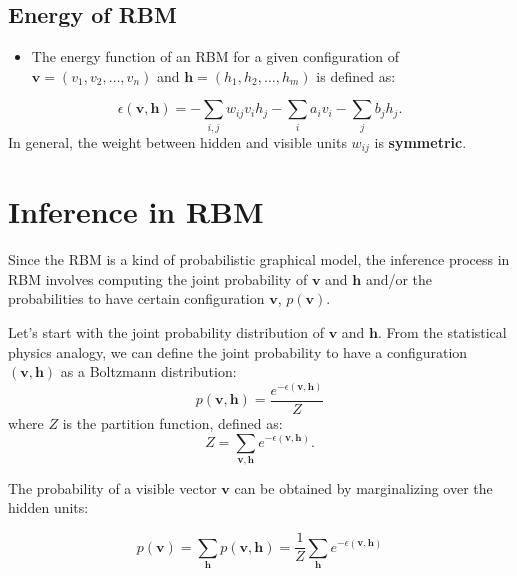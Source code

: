 \documentclass[10pt, a4paper]{article}
\begin{document}
\subsection{Energy of RBM}
\begin{itemize}
  \item The energy function of an RBM for a given configuration of
  $\mathbf{v}=(v_1, v_2, \ldots, v_n)$ and
  $\mathbf{h}=(h_1, h_2, \ldots, h_m)$ is defined as:
\end{itemize}

\begin{equation}
  \label{eq:energy}
  \epsilon(\mathbf{v}, \mathbf{h}) = -\sum_{i,j} w_{ij} v_i h_j - \sum_i a_i v_i - \sum_j b_j h_j.
\end{equation}
In general, the weight between hidden and visible units $w_{ij}$ is {\bf{symmetric}}.

\section{Inference in RBM}

Since the RBM is a kind of probabilistic graphical model, the inference process
in RBM involves computing the joint probability of $\mathbf{v}$ and $\mathbf{h}$
and/or the probabilities to have certain configuration $\mathbf{v}$, $p(\mathbf{v})$.

Let's start with the joint probability distribution of $\mathbf{v}$ and $\mathbf{h}$.
From the statistical physics analogy, we can define the joint probability to have a
configuration $(\mathbf{v}, \mathbf{h})$ as a Boltzmann distribution:
\begin{equation}
  \label{eq:joint_prob}
  p(\mathbf{v}, \mathbf{h}) = \frac{e^{-\epsilon(\mathbf{v}, \mathbf{h})}}{Z}
\end{equation}
where $Z$ is the partition function, defined as:
\begin{equation}
  \label{eq:partition_function}
  Z = \sum_{\mathbf{v}, \mathbf{h}} e^{-\epsilon(\mathbf{v}, \mathbf{h})}.
\end{equation}

The probability of a visible vector $\mathbf{v}$ can be obtained by marginalizing over the hidden units:
\begin{samplebox}
  \begin{equation}
    \label{eq:visible_prob}
    p(\mathbf{v}) = \sum_{\mathbf{h}} p(\mathbf{v}, \mathbf{h})
    = \frac{1}{Z} \sum_{\mathbf{h}} e^{-\epsilon(\mathbf{v}, \mathbf{h})}
  \end{equation}
\end{samplebox}
\end{document}
